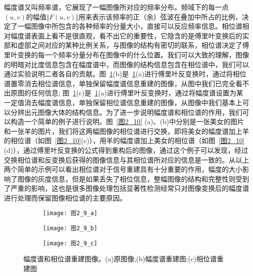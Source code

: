幅度谱又叫频率谱，它展现了一幅图像所对应的频率分布。频域下的每一点$(u,v)$的幅值$\Vert F(u,v)\Vert$用来表示该频率的正（余）弦波在叠加中所占的比例，决定了一幅图像中所包含的各种频率的分量大小，直接可以反应频率信息。相位谱相对幅度谱表面上看不是很直观，看不出它的重要性，它隐含的是傅里叶变换后的实部和虚部之间对应的某种比例关系，与图像的结构有密切的联系，相位谱决定了傅里叶变换的每一个频率分量分布在图像中的什么位置。我们可以大致的理解，图像的明暗对比度信息包含在幅度谱中，而图像的结构信息包含在相位谱中，我们可以通过实验说明二者各自的贡献。图~\ref{图2_9}(b)是~\ref{图2_9}(a)进行傅里叶反变换时，通过将相位谱置零消去相位谱信息，单独保留幅度谱信息重建的图像，从图中我们已完全看不出原图的任何信息; 图~\ref{图2_9}(c)是~\ref{图2_9}(a)进行傅里叶反变换时，通过将幅度谱设置为某一定值消去幅度谱信息，单独保留相位谱信息重建的图像，从图像中我们基本上可以分辨出元图像大体的结构信息。为了进一步说明幅度谱和相位谱的作用，我们可以构造一个简单的例子进行说明。图~\ref{图2_10} (a)、(b)中分别是一张美女的图片和一张羊的图片，我们将这两幅图像的相位谱进行交换，即将美女的幅度谱加上羊的相位谱（如图~\ref{图2_10}(c)），用羊的幅度谱加上美女的相位谱（如图~\ref{图2_10}(d)），通过傅里叶反变换的公式得到重构后的图像，通过这个例子可以发现，经过交换相位谱和反变换后获得的图像信息与其相位谱所对应的信息是一致的。从以上两个简单的示例可以看出相位谱对于信号重建具有十分重要的作用，幅度的大小影响了图像的灰度信息，但是如果丢失了相位信息，整幅图像的结构和完整性则受到了严重的影响，这也是很多图像处理包括显著性检测经常只对图像变换后的幅度谱进行处理而保留图像相位谱的主要原因。
\begin{figure}[h]
  \centering%
  \begin{subfigure}{3cm}
    \texttt{[image: 图2\_9\_a]}
    \caption{}
  \end{subfigure}
  \hspace{4em}%
  \begin{subfigure}{0.2\textwidth}
    \texttt{[image: 图2\_9\_b]}
    \caption{}
  \end{subfigure}
  \hspace{4em}%
  \begin{subfigure}{0.25\textwidth}
    \texttt{[image: 图2\_9\_c]}
    \caption{}
  \end{subfigure}
  \caption{幅度谱和相位谱重建图像。(a)原图像;(b)幅度谱重建图;(c)相位谱重建图}
  \label{图2_9}
\end{figure}

